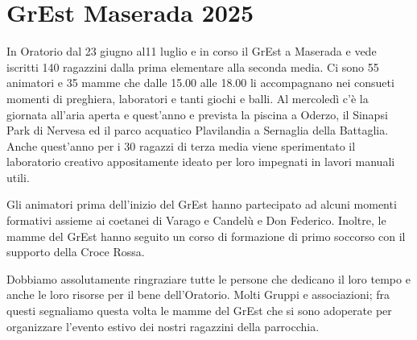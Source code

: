 \section{GrEst Maserada 2025}

In Oratorio dal 23 giugno al11 luglio e in corso il GrEst a Maserada e vede
iscritti 140 ragazzini dalla prima elementare alla seconda media. Ci sono 55
animatori e 35 mamme che dalle 15.00 alle 18.00 li accompagnano nei consueti
momenti di preghiera, laboratori e tanti giochi e balli. Al mercoledì c'è la
giornata all'aria aperta e quest'anno e prevista la piscina a Oderzo, il
Sinapsi Park di Nervesa ed il parco acquatico Plavilandia a Sernaglia della
Battaglia. Anche quest'anno per i 30 ragazzi di terza media viene sperimentato
il laboratorio creativo appositamente ideato per loro impegnati in lavori
manuali utili.

Gli animatori prima dell'inizio del GrEst hanno partecipato ad
alcuni momenti formativi assieme ai coetanei di Varago e Candelù e Don
Federico. Inoltre, le mamme del GrEst hanno seguito un corso di formazione di
primo soccorso con il supporto della Croce Rossa.

Dobbiamo assolutamente ringraziare tutte le persone che dedicano il loro tempo
e anche le loro risorse per il bene dell'Oratorio. Molti Gruppi e
associazioni; fra questi segnaliamo questa volta le mamme del GrEst che si
sono adoperate per organizzare l'evento estivo dei nostri ragazzini della
parrocchia.


